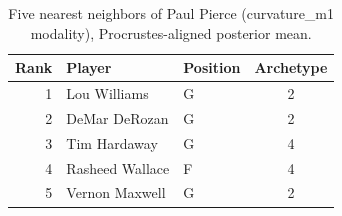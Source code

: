 \begin{table}[htbp]
  \centering\small
  \begin{tabular}{rllc}
    \toprule
    Rank & Player & Position & Archetype \\
    \midrule
    1 & Lou Williams & G & 2 \\
    2 & DeMar DeRozan & G & 2 \\
    3 & Tim Hardaway & G & 4 \\
    4 & Rasheed Wallace & F & 4 \\
    5 & Vernon Maxwell & G & 2 \\
    \bottomrule
  \end{tabular}
  \caption{Five nearest neighbors of Paul Pierce (curvature_m1 modality), Procrustes-aligned posterior mean.}
  \label{tab:Paul_Pierce_neighbors_curvature_m1}
\end{table}


